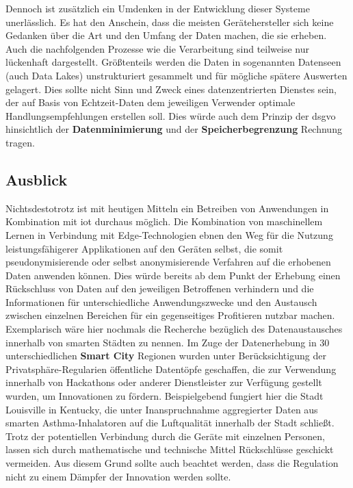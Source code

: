 Dennoch ist zusätzlich ein Umdenken in der Entwicklung dieser Systeme unerlässlich. Es hat den Anschein, dass die meisten Gerätehersteller sich keine Gedanken über die Art und den Umfang der Daten machen, die sie erheben. Auch die nachfolgenden Prozesse wie die Verarbeitung sind teilweise nur lückenhaft dargestellt. Größtenteils werden die Daten in sogenannten Datenseen (auch Data Lakes) unstrukturiert gesammelt und für mögliche spätere Auswerten gelagert. Dies sollte nicht Sinn und Zweck eines datenzentrierten Dienstes sein, der auf Basis von Echtzeit-Daten dem jeweiligen Verwender optimale Handlungsempfehlungen erstellen soll. Dies würde auch dem Prinzip der \ac{dsgvo} hinsichtlich der \textbf{Datenminimierung} und der \textbf{Speicherbegrenzung} Rechnung tragen. 

\subsection{Ausblick}
\label{sec:Zusammenfassung:ssec:Ausblick}
Nichtsdestotrotz ist mit heutigen Mitteln ein Betreiben von Anwendungen in Kombination mit \ac{iot} durchaus möglich. Die Kombination von maschinellem Lernen in Verbindung mit Edge-Technologien ebnen den Weg für die Nutzung leistungsfähigerer Applikationen auf den Geräten selbst, die somit pseudonymisierende oder selbst anonymisierende Verfahren auf die erhobenen Daten anwenden können. Dies würde bereits ab dem Punkt der Erhebung einen Rückschluss von Daten auf den jeweiligen Betroffenen verhindern und die Informationen für unterschiedliche Anwendungszwecke und den Austausch zwischen einzelnen Bereichen für ein gegenseitiges Profitieren nutzbar machen. Exemplarisch wäre hier nochmals die Recherche bezüglich des Datenaustausches innerhalb von smarten Städten \cite{BCG2020} zu nennen. Im Zuge der Datenerhebung in 30 unterschiedlichen \textbf{Smart City} Regionen wurden unter Berücksichtigung der Privatsphäre-Regularien öffentliche Datentöpfe geschaffen, die zur Verwendung innerhalb von Hackathons oder anderer Dienstleister zur Verfügung gestellt wurden, um Innovationen zu fördern. Beispielgebend fungiert hier die Stadt Louisville in Kentucky, die unter Inanspruchnahme aggregierter Daten aus smarten Asthma-Inhalatoren auf die Luftqualität innerhalb der Stadt schließt. Trotz der potentiellen Verbindung durch die Geräte mit einzelnen Personen, lassen sich durch mathematische und technische Mittel Rückschlüsse geschickt vermeiden. Aus diesem Grund sollte auch beachtet werden, dass die Regulation nicht zu einem Dämpfer der Innovation werden sollte.
